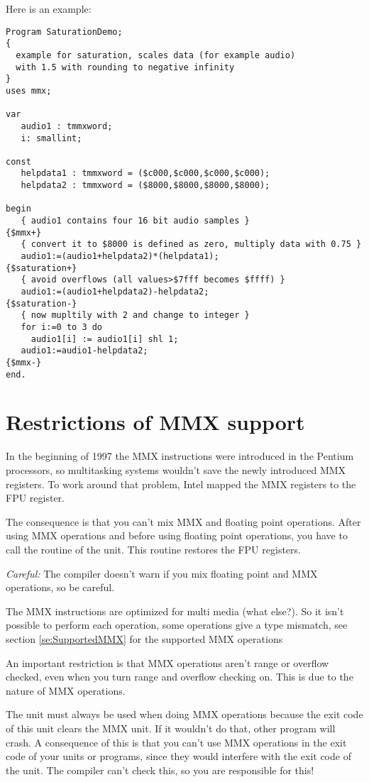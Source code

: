 Here is an example:
\begin{verbatim}
Program SaturationDemo;
{
  example for saturation, scales data (for example audio)
  with 1.5 with rounding to negative infinity
}
uses mmx;

var
   audio1 : tmmxword;
   i: smallint;

const
   helpdata1 : tmmxword = ($c000,$c000,$c000,$c000);
   helpdata2 : tmmxword = ($8000,$8000,$8000,$8000);

begin
   { audio1 contains four 16 bit audio samples }
{$mmx+}
   { convert it to $8000 is defined as zero, multiply data with 0.75 }
   audio1:=(audio1+helpdata2)*(helpdata1);
{$saturation+}
   { avoid overflows (all values>$7fff becomes $ffff) }
   audio1:=(audio1+helpdata2)-helpdata2;
{$saturation-}
   { now mupltily with 2 and change to integer }
   for i:=0 to 3 do
     audio1[i] := audio1[i] shl 1;
   audio1:=audio1-helpdata2;
{$mmx-}
end.
\end{verbatim}

\section{Restrictions of MMX support}
\label{se:MMXrestrictions}

In the beginning of 1997 the MMX instructions were introduced in the
Pentium processors, so multitasking systems wouldn't save the
newly introduced MMX registers. To work around that problem, Intel
mapped the MMX registers to the FPU register.

The consequence is that
you can't mix MMX and floating point operations. After using
MMX operations and before using floating point operations, you
have to call the routine  of the  unit.
This routine restores the FPU registers.

{\em Careful:} The compiler doesn't warn if you mix floating point and
MMX operations, so be careful.

The MMX instructions are optimized for multi media (what else?).
So it isn't possible to perform each operation, some operations
give a type mismatch, see section \ref {se:SupportedMMX} for the supported
MMX operations

An important restriction is that MMX operations aren't range or overflow
checked, even when you turn range and overflow checking on. This is due to
the nature of MMX operations.

The  unit must always be used when doing MMX operations
because the exit code of this unit clears the MMX unit. If it wouldn't do
that, other program will crash. A consequence of this is that you can't use
MMX operations in the exit code of your units or programs, since they would
interfere  with the exit code of the  unit. The compiler can't
check this, so you are responsible for this!

